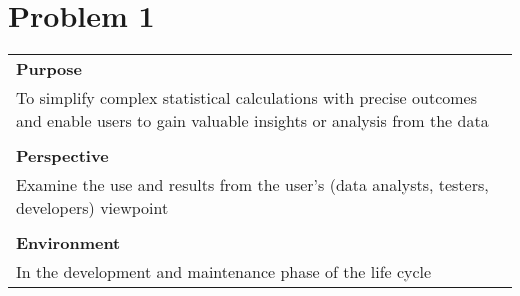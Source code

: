 \section{Problem 1}

\begin{tabularx}{\textwidth}{|X|}
\hline
\textbf{Purpose}\\
To simplify complex statistical calculations with precise outcomes and enable users to gain valuable insights or analysis from the data\\\\
\textbf{Perspective}\\
Examine the use and results from the user's (data analysts, testers, developers) viewpoint\\\\
\textbf{Environment}\\
In the development and maintenance phase of the life cycle\\
\hline
\end{tabularx}

